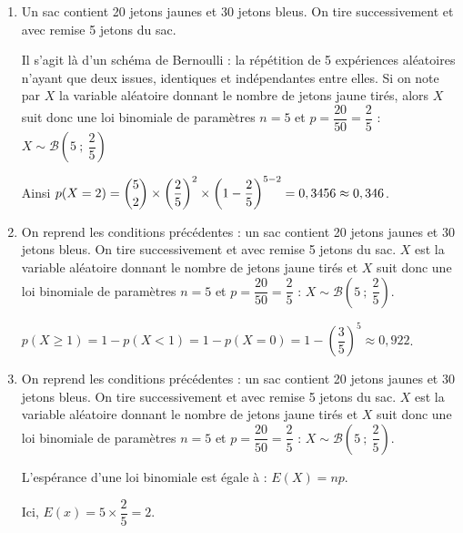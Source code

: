 \documentclass[10pt]{article}
\begin{document}
\begin{enumerate}
\hfill {}
	 \item Un sac contient 20 jetons jaunes et 30 jetons bleus. On tire successivement et avec remise 5 jetons du sac.

Il s'agit là d'un schéma de Bernoulli : la répétition de 5 expériences aléatoires n'ayant que deux issues, identiques et indépendantes entre elles. Si on note par $X$ la variable aléatoire donnant le nombre de jetons jaune tirés, alors $X$ suit donc une loi binomiale de paramètres $n = 5$ et $p = \dfrac{20}{50}=\dfrac25$ : $X \sim \mathcal{B}\left(5~;~\dfrac25\right)$

Ainsi $p(X=2)=\dbinom{5}{2}\times \left(\dfrac25\right)^2 \times \left(1-\dfrac25\right)^{5-2}=0,3456\approx 0,346$.

\hfill {}
\item On reprend les conditions précédentes : un sac contient 20 jetons jaunes et 30 jetons bleus. On tire successivement et avec remise 5 jetons du sac. $X$ est la variable aléatoire donnant le nombre de jetons jaune tirés et $X$ suit donc une loi binomiale de paramètres $n=5$ et $p=\dfrac{20}{50}=\dfrac25$ : $X \sim \mathcal{B}\left(5~;~\dfrac25\right)$.

$p(X\geqslant 1)=1-p(X<1)=1-p(X=0)=1-\left(\dfrac35\right)^5\approx0,922$.

\hfill {}
	\item On reprend les conditions précédentes : un sac contient 20 jetons jaunes et 30 jetons bleus. On tire successivement et avec remise 5 jetons du sac. $X$ est la variable aléatoire donnant le nombre de jetons jaune tirés et $X$ suit donc une loi binomiale de paramètres $n=5$ et $p=\dfrac{20}{50}=\dfrac25$ : $X \sim \mathcal{B}\left(5~;~\dfrac25\right)$.

L'espérance d'une loi binomiale est égale à : $E(X) = np$.

Ici, $E(x)=5\times \dfrac25=2$.

\hfill {}
\end{enumerate}
\end{document}
